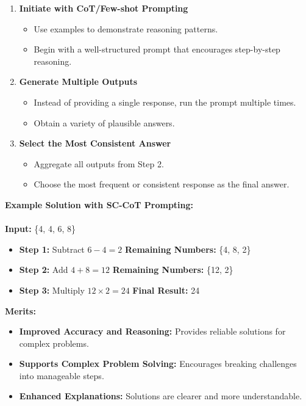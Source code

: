 \documentclass[12pt, a4paper]{article}
\begin{document}
\begin{enumerate}
    \item \textbf{Initiate with CoT/Few-shot Prompting}  
    \begin{itemize}
        \item Use examples to demonstrate reasoning patterns.  
        \item Begin with a well-structured prompt that encourages step-by-step reasoning.  
    \end{itemize}

    \item \textbf{Generate Multiple Outputs}  
    \begin{itemize}
        \item Instead of providing a single response, run the prompt multiple times.  
        \item Obtain a variety of plausible answers.  
    \end{itemize}

    \item \textbf{Select the Most Consistent Answer}  
    \begin{itemize}
        \item Aggregate all outputs from Step 2.  
        \item Choose the most frequent or consistent response as the final answer.  
    \end{itemize}
\end{enumerate}

\textbf{Example Solution with SC-CoT Prompting:} \\\\ 
\hspace{40pts}\textbf{  Input:} \{4, 4, 6, 8\}  

\begin{itemize}
    \item \textbf{Step 1:} Subtract \(6 - 4 = 2\)  
    \textbf{Remaining Numbers:} \{4, 8, 2\}  

    \item \textbf{Step 2:} Add \(4 + 8 = 12\)  
    \textbf{Remaining Numbers:} \{12, 2\}  

    \item \textbf{Step 3:} Multiply \(12 \times 2 = 24\)  
    \textbf{Final Result:} 24  
\end{itemize}

\textbf{Merits:}  
\begin{itemize}
    \item \textbf{Improved Accuracy and Reasoning:} Provides reliable solutions for complex problems.  
    \item \textbf{Supports Complex Problem Solving:} Encourages breaking challenges into manageable steps.  
    \item \textbf{Enhanced Explanations:} Solutions are clearer and more understandable.  
\end{itemize}
\end{document}
